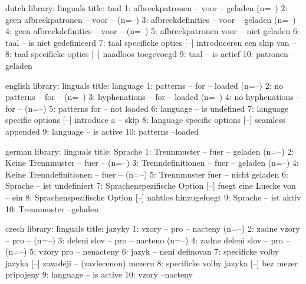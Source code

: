 


\unprotect

\startmessages  dutch  library: linguals
  title: taal
      1: afbreekpatronen -- voor -- geladen (n=--)
      2: geen afbreekpatronen -- voor -- (n=--)
      3: afbreekdefinities -- voor -- geladen (n=--)
      4: geen afbreekdefinities -- voor -- (n=--)
      5: afbreekpatronen voor -- niet geladen
      6: taal -- is niet gedefinieerd
      7: taal specifieke opties [--] introduceren een skip van --
      8: taal specifieke opties [--] naadloos toegevoegd
      9: taal -- is actief
     10: patronen --geladen 
\stopmessages

\startmessages  english  library: linguals
  title: language
      1: patterns -- for -- loaded (n=--)
      2: no patterns -- for -- (n=--)
      3: hyphenations -- for -- loaded (n=--)
      4: no hyphenations -- for -- (n=--)
      5: patterns for -- not loaded
      6: language -- is undefined
      7: language specific options [--] introduce a -- skip
      8: language specific options [--] seamless appended
      9: language -- is active
     10: patterns --loaded
\stopmessages

\startmessages  german  library: linguals
  title: Sprache
      1: Trennmuster -- fuer -- geladen (n=--)
      2: Keine Trennmuster -- fuer -- (n=--)
      3: Trenndefinitionen -- fuer -- geladen (n=--)
      4: Keine Trenndefinitionen -- fuer -- (n=--)
      5: Trennmuster fuer -- nicht geladen
      6: Sprache -- ist undefiniert
      7: Sprachenspezifische Option [--] fuegt eine Luecke von -- ein
      8: Sprachenspezifische Option [--] nahtlos hinzugefuegt
      9: Sprache -- ist aktiv
     10: Trennmuster --geladen  
\stopmessages


\startmessages  czech  library: linguals
  title: jazyky
      1: vzory -- pro -- nacteny (n=--)
      2: zadne vzory -- pro -- (n=--)
      3: deleni slov -- pro -- nacteno (n=--)
      4: zadne deleni slov -- pro -- (n=--)
      5: vzory pro -- nenacteny
      6: jazyk -- neni definovan
      7: specificke volby jazyka [--] zavadeji -- (zavlecenou) mezeru
      8: specificke volby jazyka [--] bez mezer pripojeny
      9: language -- is active
     10: vzory --nacteny 
\stopmessages

